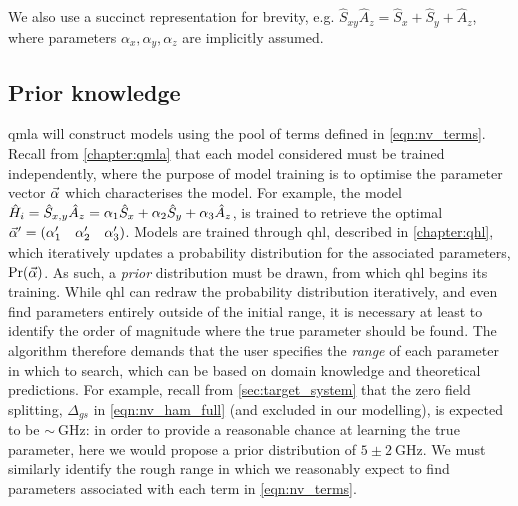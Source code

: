 We also use a succinct representation for brevity, e.g. $\hat{S}_{xy}\hat{A}_z =  \hat{S}_x + \hat{S}_y + \hat{A}_z$, 
    where parameters $\alpha_x, \alpha_y, \alpha_z$ are implicitly assumed. 

\subsection{Prior knowledge}

\gls{qmla} will construct models using the pool of terms defined in \cref{eqn:nv_terms}. 
Recall from \cref{chapter:qmla} that each model considered must be trained independently, 
    where the purpose of model training is to optimise the parameter vector $\vec{\alpha}$ which characterises the model. 
For example, the model 
    $\hat{H}_i = \hat{S}_{x,y} \hat{A}_{z} = \alpha_1 \hat{S}_x  + \alpha_2 \hat{S}_y + \alpha_3 \hat{A}_z$,
    is trained to retrieve the optimal $\vec{\alpha}^{\prime} = \begin{matrix}(\alpha_1^{\prime} & \alpha_2^{\prime} & \alpha_3^{\prime})\end{matrix}$. 
Models are trained through \gls{qhl}, described in \cref{chapter:qhl}, 
    which iteratively updates a probability distribution for the associated parameters, $\Pr(\vec{\alpha})$. 
As such, a \emph{prior} distribution must be drawn, from which \gls{qhl} begins its training. 
While \gls{qhl} can redraw the probability distribution iteratively, and even find parameters entirely outside of the initial range, 
    it is necessary at least to identify the order of magnitude where the true parameter should be found. 
The algorithm therefore demands that the user specifies the \emph{range} of each parameter in which to search, 
    which can be based on domain knowledge and theoretical predictions. 
For example, recall from \cref{sec:target_system} that the zero field splitting, $\Delta_{gs}$ in \cref{eqn:nv_ham_full} (and excluded in our modelling),
    is expected to be $\sim \SI{}{\giga\hertz}$: in order to provide a reasonable chance at learning the true parameter,
    here we would propose a prior distribution of $5 \pm 2 \SI{}{\giga\hertz}$.
We must similarly identify the rough range in which we reasonably expect to find parameters associated with each term in \cref{eqn:nv_terms}.
\par

